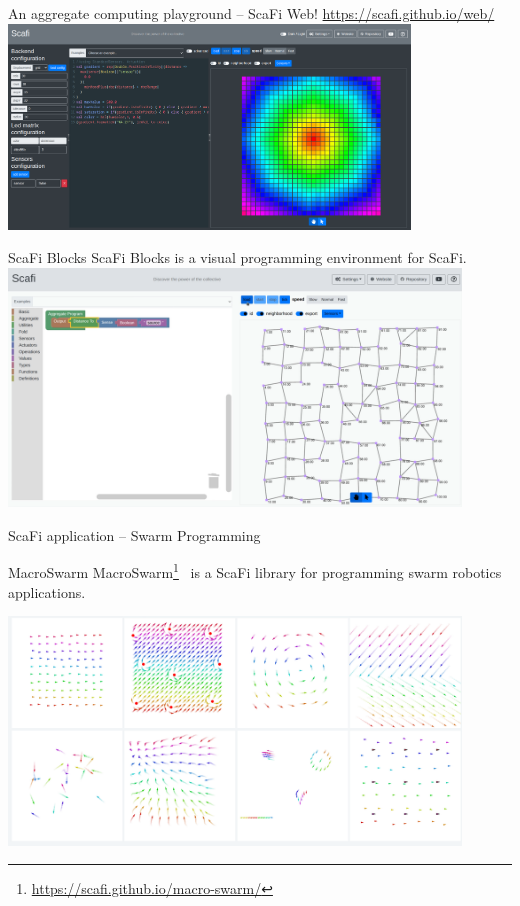 \documentclass[presentation, 9pt]{beamer}\mode<presentation>{\usetheme{AMSBolognaFC}}
\begin{document}
\begin{frame}{An aggregate computing playground -- ScaFi Web!}
\centering
\url{https://scafi.github.io/web/}
\centering
\includegraphics[width=0.8\textwidth]{img/gradient-web.png}
\end{frame}

\begin{frame}{ScaFi Blocks}
ScaFi Blocks is a visual programming environment for ScaFi.
\centering
\includegraphics[width=0.9\textwidth]{img/scafiblocks.png}
\end{frame}
\begin{frame}{ScaFi application -- Swarm Programming}
	\begin{exampleblock}{MacroSwarm}
		MacroSwarm\footnote{\url{https://scafi.github.io/macro-swarm/}}~\cite{macroswarm-arxiv} is a ScaFi library for programming swarm robotics applications.
	\end{exampleblock}
	\centering
	\includegraphics[width=0.9\textwidth]{img/macro-swarm.png}
\end{frame}
\end{document}
